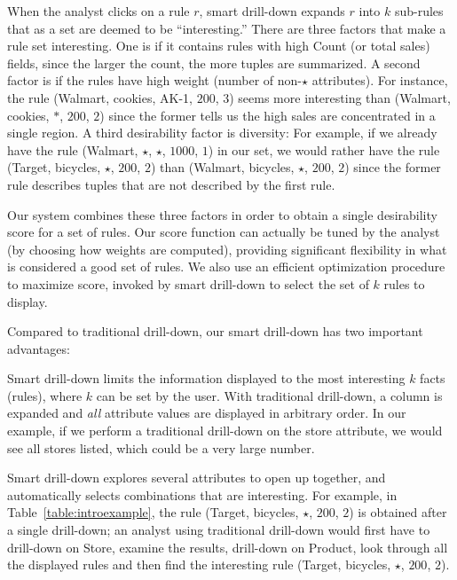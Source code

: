 \begin{example}
When the analyst clicks on a rule $r$, smart drill-down
expands $r$ into $k$ sub-rules that as a set are deemed to be ``interesting.''
There are three factors that make a rule set interesting.
One is if it contains rules with high Count (or total sales) fields,
since the larger the count, the more tuples are summarized.
A second factor is if the rules have high weight (number of non-$\star$ attributes).
For instance, the rule (Walmart, cookies, AK-1, $200$, $3$)
seems more interesting than (Walmart, cookies, $*$, $200$, $2$)
since the former tells us the high sales are concentrated in a single region.
A third desirability factor is diversity:
For example, if we already have the rule (Walmart, $\star$, $\star$, $1000$, $1$)
in our set, we would rather have the rule (Target, bicycles, $\star$, $200$, $2$)
than (Walmart, bicycles, $\star$, $200$, $2$) since the former rule
describes tuples that are not described by the first rule.

Our system combines these three factors
in order to obtain a single desirability score for a set of rules.
Our score function can actually be tuned by the analyst
(by choosing how weights are computed),
providing significant flexibility in what is considered a good set of rules.
We also use an efficient optimization procedure to maximize score, invoked
by smart drill-down to select the set of $k$ rules to display.

\end{example}

Compared to traditional drill-down, our smart drill-down has two important advantages:
\squishlist
\item
Smart drill-down limits the information displayed
to the most interesting $k$ facts (rules), where $k$ can be set by the user.
With traditional drill-down, a column is expanded and {\em all}
attribute values are displayed in arbitrary order.
In our example, if we perform a traditional drill-down on the store attribute,
we would see all stores listed, which could be a very large number.
\item
Smart drill-down explores several attributes to open up together,
and automatically selects combinations that are interesting.
For example, in Table~\ref{table:introexample},
the rule (Target, bicycles, $\star$, $200$, $2$)
is obtained after a single drill-down;
an analyst using traditional drill-down would first have to drill-down on
Store, examine the results, drill-down on Product,
look through all the displayed rules and then find the interesting rule
(Target, bicycles, $\star$, $200$, $2$). 
\squishend


